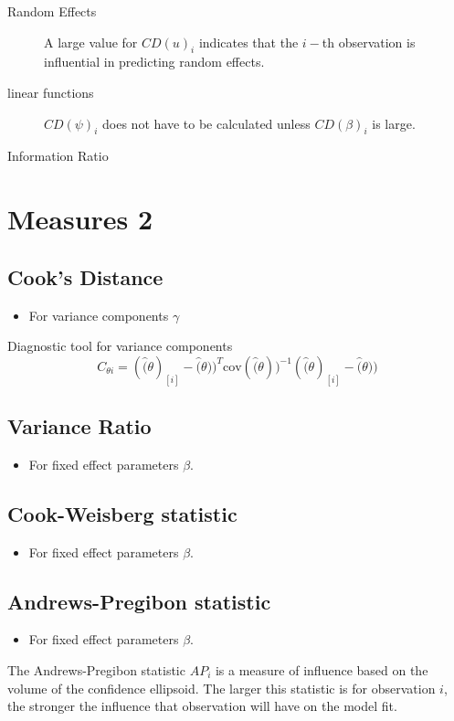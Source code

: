 \documentclass[12pt, a4paper]{article}
\theoremstyle{plain}
\theoremstyle{definition}
\theoremstyle{remark}
\begin{document}
\begin{description}
\item[Random Effects]

A large value for $CD(u)_i$ indicates that the $i-$th observation is influential in predicting random effects.

\item[linear functions]
$CD(\psi)_i$ does not have to be calculated unless $CD(\beta)_i$ is large.


\item[Information Ratio]
\end{description}

\newpage
\section{Measures 2} %

\subsection{Cook's Distance} %
\begin{itemize}
\item For variance components $\gamma$
\end{itemize}

Diagnostic tool for variance components
\[ C_{\theta i} =(\hat(\theta)_{[i]} - \hat(\theta))^{T}\mbox{cov}( \hat(\theta))^{-1}(\hat(\theta)_{[i]} - \hat(\theta))\]

\subsection{Variance Ratio} %
\begin{itemize}
\item For fixed effect parameters $\beta$.
\end{itemize}

\subsection{Cook-Weisberg statistic} %
\begin{itemize}
\item For fixed effect parameters $\beta$.
\end{itemize}

\subsection{Andrews-Pregibon statistic} %
\begin{itemize}
\item For fixed effect parameters $\beta$.
\end{itemize}
The Andrews-Pregibon statistic $AP_{i}$ is a measure of influence based on the volume of the confidence ellipsoid.
The larger this statistic is for observation $i$, the stronger the influence that observation will have on the model fit.
\end{document}
